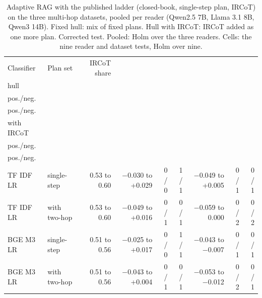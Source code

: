 \begin{table}[t]
\centering\small
\setlength{\tabcolsep}{4pt}
\caption{Adaptive RAG with the published ladder (closed-book, single-step plan, IRCoT) on the three multi-hop datasets, pooled per reader (Qwen2.5 7B, Llama 3.1 8B, Qwen3 14B). Fixed hull: mix of fixed plans. Hull with IRCoT: IRCoT added as one more plan. Corrected test. Pooled: Holm over the three readers. Cells: the nine reader and dataset tests, Holm over nine.}
\label{tab:extra_arircot}
\begin{tabular*}{\linewidth}{@{\extracolsep{\fill}}llrrrrrrr}
\toprule
Classifier & Plan set & IRCoT share & \begin{tabular}[b]{@{}r@{}}Gain, fixed \\ hull\end{tabular} & \begin{tabular}[b]{@{}r@{}}Pooled \\ pos./neg.\end{tabular} & \begin{tabular}[b]{@{}r@{}}Cells \\ pos./neg.\end{tabular} & \begin{tabular}[b]{@{}r@{}}Gain, hull \\ with IRCoT\end{tabular} & \begin{tabular}[b]{@{}r@{}}Pooled \\ pos./neg. \end{tabular} & \begin{tabular}[b]{@{}r@{}}Cells \\ pos./neg. \end{tabular} \\
\midrule
TF IDF LR & single-step & 0.53 to 0.60 & $-$0.030 to +0.029 & 0 / 0 & 1 / 1 & $-$0.049 to +0.005 & 0 / 1 & 0 / 1 \\
TF IDF LR & with two-hop & 0.53 to 0.60 & $-$0.049 to +0.016 & 0 / 1 & 0 / 1 & $-$0.059 to 0.000 & 0 / 2 & 0 / 2 \\
BGE M3 LR & single-step & 0.51 to 0.56 & $-$0.025 to +0.017 & 0 / 0 & 1 / 1 & $-$0.043 to $-$0.007 & 0 / 1 & 0 / 1 \\
BGE M3 LR & with two-hop & 0.51 to 0.56 & $-$0.043 to +0.004 & 0 / 1 & 0 / 1 & $-$0.053 to $-$0.012 & 0 / 2 & 0 / 1 \\
\bottomrule
\end{tabular*}
\end{table}
